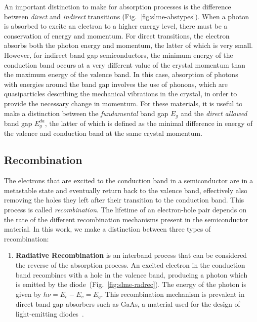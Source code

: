 \begin{refsection}
An important distinction to make for absorption processes is the difference between \textit{direct} and \textit{indirect} transitions (Fig.~\ref{fig:slme-abstypes}). When a photon is absorbed to excite an electron to a higher energy level, there must be a conservation of energy and momentum. For direct transitions, the electron absorbs both the photon energy and momentum, the latter of which is very small. However, for indirect band gap semiconductors, the minimum energy of the conduction band occurs at a very different value of the crystal momentum than the maximum energy of the valence band. In this case, absorption of photons with energies around the band gap involves the use of phonons, which are quasiparticles describing the mechanical vibrations in the crystal, in order to provide the necessary change in momentum. For these materials, it is useful to make a distinction between the \textit{fundamental} band gap $E_g$ and the \textit{direct allowed} band gap $E_g^{da}$, the latter of which is defined as the minimal difference in energy of the valence and conduction band at the same crystal momentum.

\subsection{Recombination}\label{sec:slme-recombination}

The electrons that are excited to the conduction band in a semiconductor are in a metastable state and eventually return back to the valence band, effectively also removing the holes they left after their transition to the conduction band. This process is called \textit{recombination}. The lifetime of an electron-hole pair depends on the rate of the different recombination mechanisms present in the semiconductor material. In this work, we make a distinction between three types of recombination:

\begin{enumerate}[]

	\item\textbf{Radiative Recombination} is an interband process that can be considered the reverse of the absorption process. An excited electron in the conduction band recombines with a hole in the valence band, producing a photon which is emitted by the diode~(Fig.~\ref{fig:slme-radrec}). The energy of the photon is given by $h \nu = E_c - E_v = E_g$. This recombination mechanism is prevalent in direct band gap absorbers such as GaAs, a material used for the design of light-emitting diodes~\cite{Green1981}.


\end{enumerate}
\end{refsection}
